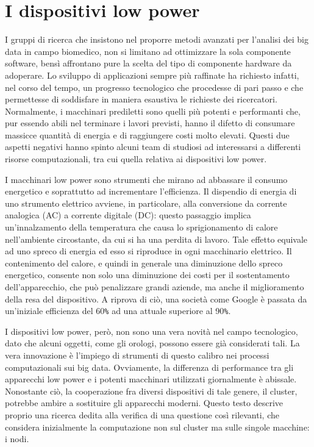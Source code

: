 \section{I dispositivi low power}
I gruppi di ricerca che insistono nel proporre metodi avanzati per l'analisi dei big data in campo biomedico, non si limitano ad ottimizzare la sola componente software, bensì affrontano pure la scelta del tipo di componente hardware da adoperare.
Lo sviluppo di applicazioni sempre più raffinate ha richiesto infatti, nel corso del tempo, un progresso tecnologico che procedesse di pari passo e che permettesse di soddisfare in maniera esaustiva le richieste dei ricercatori.
Normalmente, i macchinari prediletti sono quelli più potenti e performanti che, pur essendo abili nel terminare i lavori previsti, hanno il difetto di consumare massicce quantità di energia e di raggiungere costi molto elevati.
Questi due aspetti negativi hanno spinto alcuni team di studiosi ad interessarsi a differenti risorse computazionali, tra cui quella relativa ai dispositivi low power.

I macchinari low power sono strumenti che mirano ad abbassare il consumo energetico e soprattutto ad incrementare l'efficienza.
Il dispendio di energia di uno strumento elettrico avviene, in particolare, alla conversione da corrente analogica (AC) a corrente digitale (DC): questo passaggio implica un'innalzamento della temperatura che causa lo sprigionamento di calore nell'ambiente circostante, da cui si ha una perdita di lavoro.
Tale effetto equivale ad uno spreco di energia ed esso si riproduce in ogni macchinario elettrico.
Il contenimento del calore, e quindi in generale una diminuzione dello spreco energetico, consente non solo una diminuzione dei costi per il sostentamento dell'apparecchio, che può penalizzare grandi aziende, ma anche il miglioramento della resa del dispositivo.
A riprova di ciò, una società come Google è passata da un'iniziale efficienza del 60\verb!%! ad una attuale superiore al 90\verb!%!.

I dispositivi low power, però, non sono una vera novità nel campo tecnologico, dato che alcuni oggetti, come gli orologi, possono essere già considerati tali.
La vera innovazione è l'impiego di strumenti di questo calibro nei processi computazionali sui big data.
Ovviamente, la differenza di performance tra gli apparecchi low power e i potenti macchinari utilizzati giornalmente è abissale.
Nonostante ciò, la cooperazione fra diversi dispositivi di tale genere, il cluster, potrebbe ambire a sostituire gli apparecchi moderni.
Questo testo descrive proprio una ricerca dedita alla verifica di una questione così rilevanti, che considera inizialmente la computazione non sul cluster ma sulle singole macchine: i nodi.

